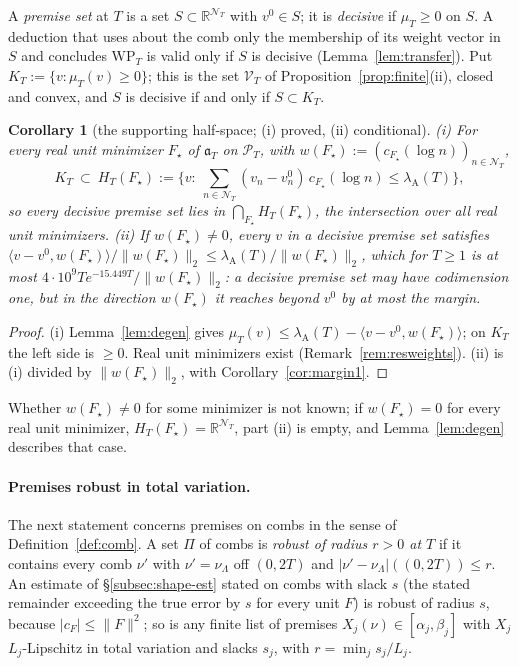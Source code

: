 \documentclass[11pt]{amsart}
\newtheorem{corollary}[theorem]{Corollary}
\theoremstyle{definition}
\theoremstyle{remark}
\newcommand{\R}{\mathbb R}
\newcommand{\PT}{\mathcal P_T}
\newcommand{\lamA}{\lambda_{\mathrm A}(T)}
\newcommand{\NT}{\mathcal N_T}
\begin{document}
A \emph{premise set} at $T$ is a set $S\subset\R^{\NT}$ with $v^0\in S$; it is \emph{decisive} if $\mu_T\ge0$ on $S$. A deduction
that uses about the comb only the membership of its weight vector in $S$ and concludes $\mathrm{WP}_T$ is valid only if $S$ is decisive
(Lemma~\ref{lem:transfer}). Put $K_T:=\{v:\mu_T(v)\ge0\}$; this is the set $\mathcal V_T$ of Proposition~\ref{prop:finite}(ii), closed and
convex, and $S$ is decisive if and only if $S\subset K_T$.

\begin{corollary}[the supporting half-space; (i) proved, (ii) conditional]\label{cor:geo-half}
\emph{(i)} For every real unit minimizer $F_\star$ of $\mathfrak a_T$ on $\PT$, with $w(F_\star):=(c_{F_\star}(\log n))_{n\in\NT}$,
\[
K_T\ \subset\ H_T(F_\star):=\Big\{v:\ \sum_{n\in\NT}(v_n-v^0_n)\,c_{F_\star}(\log n)\le\lamA\Big\},
\]
so every decisive premise set lies in $\bigcap_{F_\star}H_T(F_\star)$, the intersection over all real unit minimizers.
\emph{(ii)} If $w(F_\star)\ne0$, every $v$ in a decisive premise set satisfies
$\langle v-v^0,w(F_\star)\rangle/\|w(F_\star)\|_2\le\lamA/\|w(F_\star)\|_2$, which for $T\ge1$ is at most
$4\cdot10^9Te^{-15.449T}/\|w(F_\star)\|_2$: a decisive premise set may have codimension one, but in the direction $w(F_\star)$ it reaches
beyond $v^0$ by at most the margin.
\end{corollary}
\begin{proof}
(i) Lemma~\ref{lem:degen} gives $\mu_T(v)\le\lamA-\langle v-v^0,w(F_\star)\rangle$; on $K_T$ the left side is $\ge0$. Real unit minimizers
exist (Remark~\ref{rem:resweights}). (ii) is (i) divided by $\|w(F_\star)\|_2$, with Corollary~\ref{cor:margin1}.
\end{proof}

Whether $w(F_\star)\ne0$ for some minimizer is not known; if $w(F_\star)=0$ for every real unit minimizer, $H_T(F_\star)=\R^{\NT}$,
part (ii) is empty, and Lemma~\ref{lem:degen} describes that case.

\paragraph{Premises robust in total variation.}
The next statement concerns premises on combs in the sense of Definition~\ref{def:comb}. A set $\Pi$ of combs is \emph{robust of
radius $r>0$ at $T$} if it contains every comb $\nu'$ with $\nu'=\nu_\Lambda$ off $(0,2T)$ and $|\nu'-\nu_\Lambda|((0,2T))\le r$. An
estimate of \S\ref{subsec:shape-est} stated on combs with slack $s$ (the stated remainder exceeding the true error by $s$ for every unit
$F$) is robust of radius $s$, because $|c_F|\le\|F\|^2$; so is any finite list of premises $X_j(\nu)\in[\alpha_j,\beta_j]$ with $X_j$
$L_j$-Lipschitz in total variation and slacks $s_j$, with $r=\min_js_j/L_j$.
\end{document}

